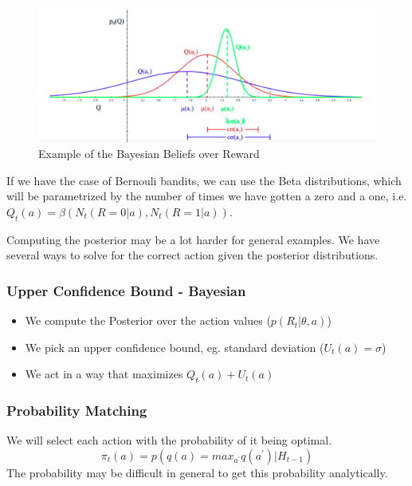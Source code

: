 \begin{figure}[H]
    \centering
    \includegraphics[width=\linewidth]{img/rl/ucb-bandits.png}
    \caption{Example of the Bayesian Beliefs over Reward}
    \label{fig:ucb-bayesian-bandits}
\end{figure}

If we have the case of Bernouli bandits, we can use the Beta distributions, which will be parametrized by the number of times we have gotten a zero and a one, i.e. $Q_t(a) = \beta(N_t(R = 0 | a), N_t(R = 1 | a))$.

Computing the posterior may be a lot harder for general examples. We have several ways to solve for the correct action given the posterior distributions.

\subsubsection{Upper Confidence Bound - Bayesian}

\begin{itemize}
    \item We compute the Posterior over the action values ($p(R_t | \theta, a)$)
    \item We pick an upper confidence bound, eg. standard deviation ($U_t(a) = \sigma$)
    \item We act in a way that maximizes $Q_t(a) + U_t(a)$
\end{itemize}

\subsubsection{Probability Matching}

We will select each action with the probability of it being optimal.
\begin{equation}
    \pi_t(a) = p(q(a) = max_{a^\prime} q(a^\prime) \vert H_{t-1})
\end{equation}
The probability may be difficult in general to get this probability analytically.

